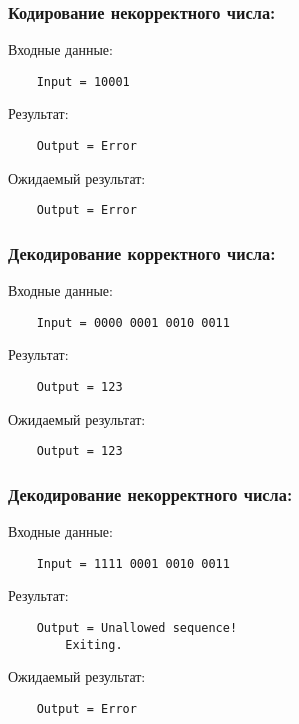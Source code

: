 \documentclass[12pt, a4paper]{report}
\begin{document}
\subsubsection*{Кодирование некорректного числа:}
Входные данные:
\begin{lstlisting}
	Input = 10001
\end{lstlisting}
Результат:
\begin{lstlisting}
	Output = Error
\end{lstlisting}
Ожидаемый результат:
\begin{lstlisting}
	Output = Error
\end{lstlisting}
\subsubsection*{Декодирование корректного числа:}
Входные данные:
\begin{lstlisting}
	Input = 0000 0001 0010 0011 
\end{lstlisting}
Результат:
\begin{lstlisting}
	Output = 123
\end{lstlisting}
Ожидаемый результат:
\begin{lstlisting}
	Output = 123
\end{lstlisting}
\subsubsection*{Декодирование некорректного числа:}
Входные данные:
\begin{lstlisting}
	Input = 1111 0001 0010 0011 
\end{lstlisting}
Результат:
\begin{lstlisting}
	Output = Unallowed sequence!
		Exiting.
\end{lstlisting}
Ожидаемый результат:
\begin{lstlisting}
	Output = Error
\end{lstlisting}
\end{document}
